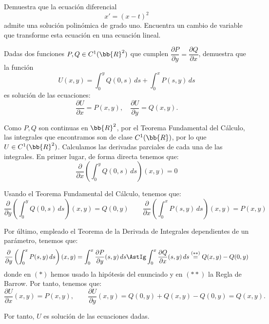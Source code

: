 \documentclass[12pt]{article}
\begin{document}
    \begin{ejercicio}
        Demuestra que la ecuación diferencial
        \begin{equation*}
            x' = (x - t)^2
        \end{equation*}
        admite una solución polinómica de grado uno. Encuentra un cambio de variable que transforme esta ecuación en una ecuación lineal.
    \end{ejercicio}

    \begin{ejercicio}
        Dadas dos funciones $P,Q \in C^1(\bb{R}^2)$ que cumplen $\dfrac{\partial P}{\partial y} = \dfrac{\partial Q}{\partial x}$, demuestra que la función
        \begin{equation*}
            U(x,y) = \int_0^y Q(0,s)\,ds + \int_0^x P(s,y)\,ds
        \end{equation*}
        es solución de las ecuaciones:
        \begin{equation*}
            \dfrac{\partial U}{\partial x} = P(x,y), \quad \dfrac{\partial U}{\partial y} = Q(x,y).
        \end{equation*}

        Como $P,Q$ son continuas en $\bb{R}^2$, por el Teorema Fundamental del Cálculo, las integrales que encontramos son de clase $C^1(\bb{R})$, por lo que $U\in C^1(\bb{R}^2)$. Calculamos las derivadas parciales de cada una de las integrales.
        En primer lugar, de forma directa tenemos que:
        \begin{equation*}
            \dfrac{\partial}{\partial x}\left(\int_0^y Q(0,s)\,ds\right)(x,y) = 0
        \end{equation*}

        Usando el Teorema Fundamental del Cálculo, tenemos que:
        \begin{equation*}
            \dfrac{\partial}{\partial y}\left(\int_0^y Q(0,s)\,ds\right)(x,y) = Q(0,y)\qquad 
            \dfrac{\partial}{\partial x}\left(\int_0^x P(s,y)\,ds\right)(x,y) = P(x,y)
        \end{equation*}

        Por último, empleado el Teorema de la Derivada de Integrales dependientes de un parámetro, tenemos que:
        \begin{equation*}
            \dfrac{\partial}{\partial y}\left(\int_0^x P(s,y)\,ds\right)(x,y) = \int_0^x \dfrac{\partial P}{\partial y}(s,y)\,ds
            \AstIg \int_0^x \dfrac{\partial Q}{\partial x}(s,y)\,ds \stackrel{(\ast\ast)}{=} Q(x,y)-Q(0,y)
        \end{equation*}
        donde en $(\ast)$ hemos usado la hipótesis del enunciado y en $(\ast\ast)$ la Regla de Barrow. Por tanto, tenemos que:
        \begin{equation*}
            \dfrac{\partial U}{\partial x}(x,y) = P(x,y), \qquad \dfrac{\partial U}{\partial y}(x,y) = Q(0,y) + Q(x,y) - Q(0,y) = Q(x,y).
        \end{equation*}

        Por tanto, $U$ es solución de las ecuaciones dadas.
    \end{ejercicio}
\end{document}
